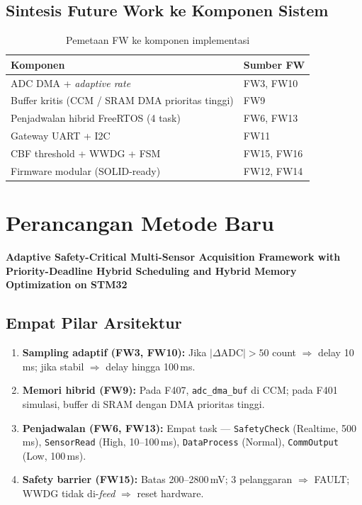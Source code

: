 \documentclass[12pt,a4paper]{article}
\begin{document}
\subsection{Sintesis Future Work ke Komponen Sistem}
\begin{table}[H]
\centering
\caption{Pemetaan FW ke komponen implementasi}\label{tab:fwmap}
\begin{tabular}{@{}ll@{}}
\toprule
\textbf{Komponen} & \textbf{Sumber FW} \\
\midrule
ADC DMA + \textit{adaptive rate} & FW3, FW10 \\
Buffer kritis (CCM / SRAM DMA prioritas tinggi) & FW9 \\
Penjadwalan hibrid FreeRTOS (4 task) & FW6, FW13 \\
Gateway UART + I2C & FW11 \\
CBF threshold + WWDG + FSM & FW15, FW16 \\
Firmware modular (SOLID-ready) & FW12, FW14 \\
\bottomrule
\end{tabular}
\end{table}

\section{Perancangan Metode Baru}
\begin{center}
\textbf{Adaptive Safety-Critical Multi-Sensor Acquisition Framework with Priority-Deadline Hybrid Scheduling and Hybrid Memory Optimization on STM32}
\end{center}

\subsection{Empat Pilar Arsitektur}
\begin{enumerate}
    \item \textbf{Sampling adaptif (FW3, FW10):} Jika $|\Delta\mathrm{ADC}| > 50$ count $\Rightarrow$ delay 10\,ms; jika stabil $\Rightarrow$ delay hingga 100\,ms.
    \item \textbf{Memori hibrid (FW9):} Pada F407, \texttt{adc\_dma\_buf} di CCM; pada F401 simulasi, buffer di SRAM dengan DMA prioritas tinggi.
    \item \textbf{Penjadwalan (FW6, FW13):} Empat task --- \texttt{SafetyCheck} (Realtime, 500\,ms), \texttt{SensorRead} (High, 10--100\,ms), \texttt{DataProcess} (Normal), \texttt{CommOutput} (Low, 100\,ms).
    \item \textbf{Safety barrier (FW15):} Batas 200--2800\,mV; 3 pelanggaran $\Rightarrow$ FAULT; WWDG tidak di-\textit{feed} $\Rightarrow$ reset hardware.
\end{enumerate}
\end{document}
